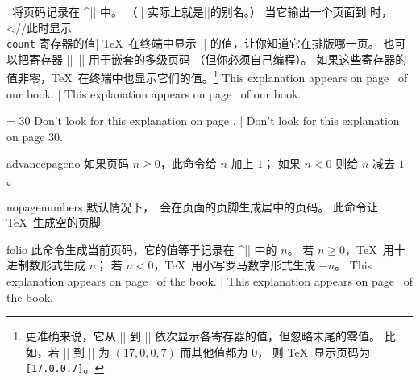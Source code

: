 \PlainTeX\ 将页码记录在 ^|| 中。%
（|\pageno| 实际上就是||的别名。）
当它输出一个页面到 \dvifile 时，
^^|\shipout//此时显示 {\tt\\count} 寄存器的值|
\TeX\ 在终端中显示  || 的值，让你知道它在排版哪一页。
也可以把寄存器 ||--|| 用于嵌套的多级页码
（但你必须自己编程）。
如果这些寄存器的值非零，\TeX\ 在终端中也显示它们的值。\footnote{
更准确来说，它从 || 到 || 依次显示各寄存器的值，但忽略末尾的零值。
比如，若 || 到 || 为 $(17, 0 , 0, 7)$ 而其他值都为 $0$，
则 \TeX\ 显示页码为 {\tt [17.0.0.7]}。}
\example
This explanation appears on page \number\pageno\
of our book.
|
\produces
This explanation appears on page \number\pageno\
of our book.

\nextexample
\pageno = 30 %
Don't look for this explanation on page \number\pageno.
|
\produces
Don't look for this explanation on page 30.
\endexample
\enddesc

\begindesc
\cts advancepageno {}
\explain
如果页码 $n\ge0$，此命令给 $n$ 加上 $1$；
如果 $n<0$ 则给 $n$ 减去 $1$。
\enddesc

\begindesc
\easy\cts nopagenumbers {}
\explain
默认情况下，\plainTeX\ 会在页面的页脚生成居中的页码。
此命令让 \TeX\ 生成空的页脚.
\enddesc

\begindesc
\cts folio {}
\explain
此命令生成当前页码，它的值等于记录在 ^|\pageno| 中的 $n$。
若 $n\ge0$，\TeX\ 用十进制数形式生成 $n$；
若 $n<0$，\TeX\ 用小写罗马数字形式生成 $-n$。
\example
This explanation appears on page \folio\ of the book.
|
\produces
This explanation appears on page \folio\ of the book.
\endexample

